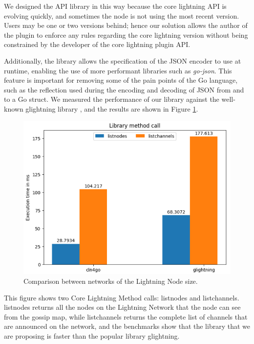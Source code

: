 We designed the API library in this way because the core lightning API is 
evolving quickly, and sometimes the node is not using the most recent version. 
Users may be one or two versions behind; hence our solution allows the author of 
the plugin to enforce any rules regarding the core lightning version without being 
constrained by the developer of the core lightning plugin API.

Additionally, the library allows the specification of the JSON encoder to use 
at runtime, enabling the use of more performant libraries 
such as \emph{go-json}\cite{gojson}. This feature is 
important for removing some of the pain points of the Go language, 
such as the reflection used during the encoding and decoding of JSON from and 
to a Go struct. We measured the performance of our library against the well-known 
glightning library \cite{glightning}, and the results are shown 
in Figure \ref{fig:api-go-bench}.

\begin{figure}[H]
    \begin{center}
      \includegraphics[scale=0.5]{imgs/api-go-bench.png}
    \end{center}
    \caption{Comparison between networks of the Lightning Node size.}
    \label{fig:api-go-bench}
\end{figure}

This figure shows two Core Lightning Method calls: listnodes and listchannels. listnodes
returns all the nodes on the Lightning Network that the node can see from the
gossip map, while listchannels returns the complete list of channels that are announced
on the network, and the benchmarks show that the library that we are proposing is faster
than the popular library glightning.


